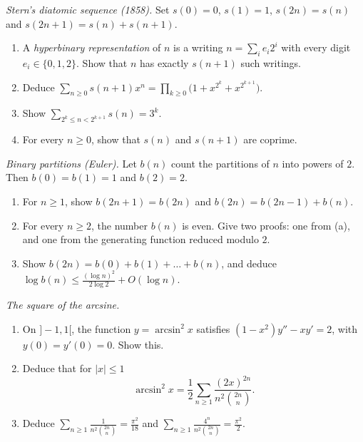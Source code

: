 \begin{exercise}[$\star\star$]\label{pb:stern}
\emph{Stern's diatomic sequence (1858).} Set $s(0)=0$, $s(1)=1$, $s(2n)=s(n)$ and $s(2n+1)=s(n)+s(n+1)$.
\begin{enumerate}[label=(\alph*)]
\item A \emph{hyperbinary representation} of $n$ is a writing $n=\sum_ie_i2^i$ with every digit $e_i\in\{0,1,2\}$. Show that $n$ has exactly
$s(n+1)$ such writings.
\item Deduce $\sum_{n\ge0}s(n+1)x^n=\prod_{k\ge0}\bigl(1+x^{2^k}+x^{2^{k+1}}\bigr)$.
\item Show $\sum_{2^k\le n<2^{k+1}}s(n)=3^k$.
\item For every $n\ge0$, show that $s(n)$ and $s(n+1)$ are coprime.
\end{enumerate}
\end{exercise}

\begin{exercise}[$\star\star$]\label{pb:binarypart}
\emph{Binary partitions (Euler).} Let $b(n)$ count the partitions of $n$ into powers of $2$. Then $b(0)=b(1)=1$ and $b(2)=2$.
\begin{enumerate}[label=(\alph*)]
\item For $n\ge1$, show $b(2n+1)=b(2n)$ and $b(2n)=b(2n-1)+b(n)$.
\item For every $n\ge2$, the number $b(n)$ is even. Give two proofs: one from (a), and one from the generating function reduced modulo $2$.
\item Show $b(2n)=b(0)+b(1)+\dots+b(n)$, and deduce $\log b(n)\le\frac{(\log n)^2}{2\log2}+O(\log n)$.
\end{enumerate}
\end{exercise}

\begin{exercise}[$\star\star$]\label{pb:arcsin}
\emph{The square of the arcsine.}
\begin{enumerate}[label=(\alph*)]
\item On $]-1,1[$, the function $y=\arcsin^2x$ satisfies $(1-x^2)y''-xy'=2$, with $y(0)=y'(0)=0$. Show this.
\item Deduce that for $|x|\le1$
\[
\arcsin^2x=\frac12\sum_{n\ge1}\frac{(2x)^{2n}}{n^2\binom{2n}n}.
\]
\item Deduce $\displaystyle\sum_{n\ge1}\frac1{n^2\binom{2n}n}=\frac{\pi^2}{18}$ and $\displaystyle\sum_{n\ge1}\frac{4^n}{n^2\binom{2n}n}=\frac{\pi^2}2$.
\end{enumerate}
\end{exercise}


